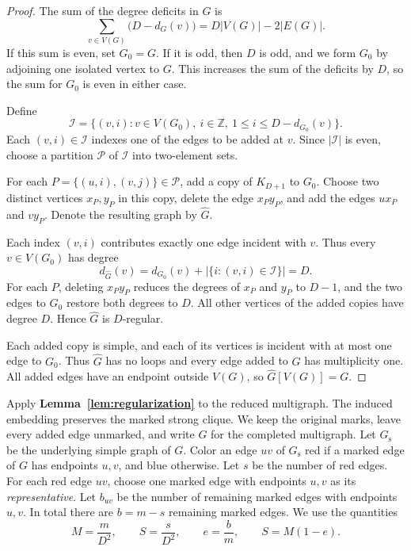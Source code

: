 \documentclass[preprint,11pt,numbers]{elsarticle-arxiv}
\numberwithin{equation}{section}
\theoremstyle{definition}
\begin{document}
\begin{proof}
The sum of the degree deficits in $G$ is
\[
 \sum_{v\in V(G)}\bigl(D-d_G(v)\bigr)=D|V(G)|-2|E(G)|.
\]
If this sum is even, set $G_0=G$. If it is odd, then $D$ is odd,
and we form $G_0$ by adjoining one isolated vertex to $G$. This
increases the sum of the deficits by $D$, so the sum for $G_0$
is even in either case.

Define
\[
 \mathcal I=\bigl\{(v,i):v\in V(G_0),\ i\in\mathbb Z,\
                     1\leq i\leq D-d_{G_0}(v)\bigr\}.
\]
Each $(v,i)\in\mathcal I$ indexes one of the edges to be added
at $v$. Since $|\mathcal I|$ is even, choose a partition
$\mathcal P$ of $\mathcal I$ into two-element sets.

For each $P=\{(u,i),(v,j)\}\in\mathcal P$, add a copy of
$K_{D+1}$ to $G_0$. Choose two distinct vertices $x_P,y_P$ in
this copy, delete the edge $x_Py_P$, and add the edges $ux_P$
and $vy_P$. Denote the resulting graph by $\widehat G$.

Each index $(v,i)$ contributes exactly one edge incident with
$v$. Thus every $v\in V(G_0)$ has degree
\[
 d_{\widehat G}(v)=d_{G_0}(v)+|\{i:(v,i)\in\mathcal I\}|=D.
\]
For each $P$, deleting $x_Py_P$ reduces the degrees of $x_P$ and
$y_P$ to $D-1$, and the two edges to $G_0$ restore both degrees to
$D$. All other vertices of the added copies have degree $D$.
Hence $\widehat G$ is $D$-regular.

Each added copy is simple, and each of its vertices is incident
with at most one edge to $G_0$. Thus $\widehat G$ has no loops
and every edge added to $G$ has multiplicity one. All added edges
have an endpoint outside $V(G)$, so $\widehat G[V(G)]=G$.
\end{proof}

Apply \textbf{Lemma~\ref{lem:regularization}} to the reduced
multigraph. The induced embedding preserves the marked strong clique.
We keep the original marks, leave every added edge unmarked, and
write $G$ for the completed multigraph.
Let $G_{\mathrm s}$ be the underlying simple graph of $G$. Color
an edge $uv$ of $G_{\mathrm s}$ red if a marked edge of $G$ has
endpoints $u,v$, and blue otherwise. Let $s$ be the number of red
edges. For each red edge $uv$, choose one marked edge with endpoints
$u,v$ as its \emph{representative}. Let $b_{uv}$ be the number of
remaining marked edges with endpoints $u,v$. In total there are
$b=m-s$ remaining marked edges. We use the quantities
\begin{equation}\label{eq:weighted-parameters}
 M=\frac{m}{D^2},\qquad S=\frac{s}{D^2},\qquad
 e=\frac{b}{m},\qquad S=M(1-e).
\end{equation}
\end{document}
